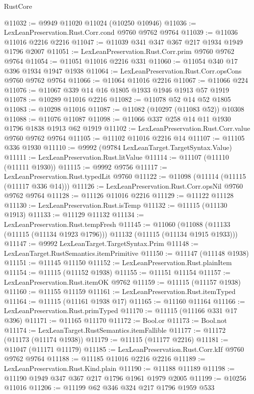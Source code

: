 \begin{lexlean}{RustCore}
\begin{coremodule}
@11032 := @9949 @11020 @11024 (@10250 @10946)
@11036 := LexLeanPreservation.Rust.Corr.cond @9760 @9762 @9764
@11039 := @11036 @11016 @2216 @2216
@11047 := @11039 @341 @347 @367 @217 @1934 @1949 @1796 @2007
@11051 := LexLeanPreservation.Rust.Corr.prim @9760 @9762 @9764
@11054 := @11051 @11016 @2216 @331
@11060 := @11054 @340 @17 @396 @1934 @1947 @1938
@11064 := LexLeanPreservation.Rust.Corr.opsCons @9760 @9762 @9764
@11066 := @11064 @11016 @2216
@11067 := @11066 @224
@11076 := @11067 @339 @14 @16 @1805 @1933 @1946 @1913 @57 @1919
@11078 := @10289 @11016 @2216
@11082 := @11078 @52 @14 @52 @1805
@11083 := @10298 @11016
@11087 := @11082 (@10297 (@11083 @52)) @10308
@11088 := @11076 @11087
@11098 := @11066 @337 @258 @14 @11 @1930 @1796 @1838 @1913 @62 @1919
@11102 := LexLeanPreservation.Rust.Corr.value @9760 @9762 @9764
@11105 := @11102 @11016 @2216 @14
@11107 := @11105 @336 @1930
@11110 := @9992 (@9784 LexLeanTarget.TargetSyntax.Value)
@11111 := LexLeanPreservation.Rust.litValue
@11114 := @11107 (@11110 (@11111 @1930))
@11115 := @9992 @9756
@11117 := LexLeanPreservation.Rust.typedLit @9760
@11122 := @11098 (@11114 (@11115 (@11117 @336 @14)))
@11126 := LexLeanPreservation.Rust.Corr.opsNil @9760 @9762 @9764
@11128 := @11126 @11016 @2216
@11129 := @11122 @11128
@11130 := LexLeanPreservation.Rust.isTemp
@11132 := @11115 (@11130 @1913)
@11133 := @11129 @11132
@11134 := LexLeanPreservation.Rust.tempFresh
@11145 := @11060
    (@11088 (@11133 (@11115 (@11134 @1923 @1796))) @11132 (@11115 (@11134 @1915 @1933)))
@11147 := @9992 LexLeanTarget.TargetSyntax.Prim
@11148 := LexLeanTarget.RustSemantics.itemPrimitive
@11150 := @11147 (@11148 @1938)
@11151 := @11145 @11150
@11152 := LexLeanPreservation.Rust.plainItem
@11154 := @11115 (@11152 @1938)
@11155 := @11151 @11154
@11157 := LexLeanPreservation.Rust.itemOK @9762
@11159 := @11115 (@11157 @1938)
@11160 := @11155 @11159
@11161 := LexLeanPreservation.Rust.itemTyped
@11164 := @11115 (@11161 @1938 @17)
@11165 := @11160 @11164
@11166 := LexLeanPreservation.Rust.primTyped
@11170 := @11115 (@11166 @331 @17 @396)
@11171 := @11165 @11170
@11172 := Bool.or
@11173 := Bool.not
@11174 := LexLeanTarget.RustSemantics.itemFallible
@11177 := @11172 (@11173 (@11174 @1938))
@11179 := @11115 (@11177 @2216)
@11181 := @11047 (@11171 @11179)
@11185 := LexLeanPreservation.Rust.Corr.kIf @9760 @9762 @9764
@11188 := @11185 @11016 @2216 @2216
@11189 := LexLeanPreservation.Rust.Kind.plain
@11190 := @11188 @11189
@11198 := @11190 @1949 @347 @367 @217 @1796 @1961 @1979 @2005
@11199 := @10256 @11016
@11206 := @11199 @62 @346 @324 @217 @1796 @1959 @533

\end{coremodule}
\end{lexlean}
